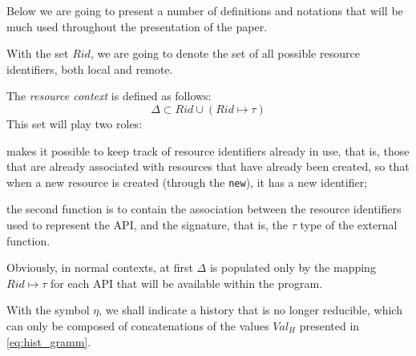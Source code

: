 Below we are going to present a number of definitions and notations that will be much used throughout the presentation of the paper.

\begin{notation}[$Rid$]
    With the set $Rid$, we are going to denote the set of all possible resource identifiers, both local and remote.
\end{notation}

\begin{definition}
    The \emph{resource context} is defined as follows:
    \begin{equation*}
        \Delta \subset Rid \cup (Rid \mapsto \tau)
    \end{equation*}
    This set will play two roles:
    \begin{enumerate*}[label=(\roman*)]
        \item makes it possible to keep track of resource identifiers already in use, that is, those that are already associated with resources that have already been created, so that when a new resource is created (through the \verb|new|), it has a new identifier;
        \item the second function is to contain the association between the resource identifiers used to represent the API, and the signature, that is, the $\tau$ type of the external function.
    \end{enumerate*}
    Obviously, in normal contexts, at first $\Delta$ is populated only by the mapping $Rid \mapsto \tau$ for each API that will be available within the program.
\end{definition}

\begin{notation}[$\eta$]
    With the symbol $\eta$, we shall indicate a history that is no longer reducible, which can only be composed of concatenations of the values $Val_H$ presented in \ref{eq:hist_gramm}.
\end{notation}

